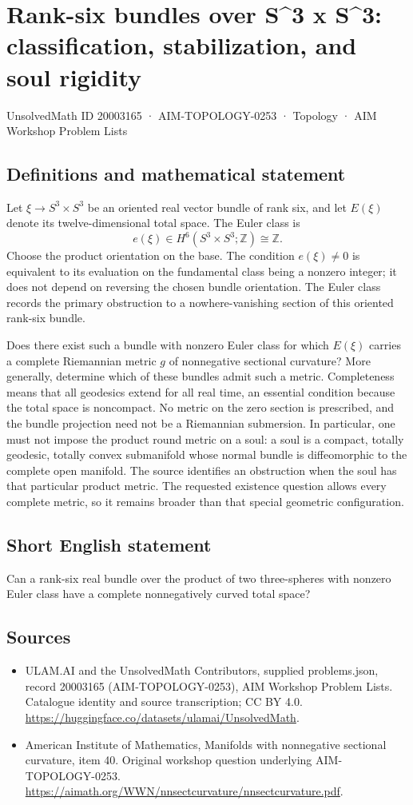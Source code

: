 \documentclass[11pt,a4paper]{article}
\begin{document}
\section*{Rank-six bundles over S\textasciicircum{}3 x S\textasciicircum{}3: classification, stabilization, and soul rigidity}\label{20003165}
{\small UnsolvedMath ID 20003165 · AIM-TOPOLOGY-0253 · Topology · AIM Workshop Problem Lists}
\subsection{Definitions and mathematical statement}
Let $\xi\to S^3\times S^3$ be an oriented real vector bundle of rank six, and let $E(\xi)$ denote its twelve-dimensional total space.
The Euler class is
\[
 e(\xi)\in H^6(S^3\times S^3;\mathbb Z)\cong\mathbb Z.
\]
Choose the product orientation on the base.
The condition $e(\xi)\ne0$ is equivalent to its evaluation on the fundamental class being a nonzero integer; it does not depend on reversing the chosen bundle orientation.
The Euler class records the primary obstruction to a nowhere-vanishing section of this oriented rank-six bundle.

Does there exist such a bundle with nonzero Euler class for which $E(\xi)$ carries a complete Riemannian metric $g$ of nonnegative sectional curvature?
More generally, determine which of these bundles admit such a metric.
Completeness means that all geodesics extend for all real time, an essential condition because the total space is noncompact.
No metric on the zero section is prescribed, and the bundle projection need not be a Riemannian submersion.
In particular, one must not impose the product round metric on a soul: a soul is a compact, totally geodesic, totally convex submanifold whose normal bundle is diffeomorphic to the complete open manifold.
The source identifies an obstruction when the soul has that particular product metric.
The requested existence question allows every complete metric, so it remains broader than that special geometric configuration.
\subsection{Short English statement}
Can a rank-six real bundle over the product of two three-spheres with nonzero Euler class have a complete nonnegatively curved total space?
\subsection{Sources}
\begin{itemize}
\item[S1] ULAM.AI and the UnsolvedMath Contributors, supplied problems.json, record 20003165 (AIM-TOPOLOGY-0253), AIM Workshop Problem Lists. Catalogue identity and source transcription; CC BY 4.0.
\url{https://huggingface.co/datasets/ulamai/UnsolvedMath}.
\item[S2] American Institute of Mathematics, Manifolds with nonnegative sectional curvature, item 40. Original workshop question underlying AIM-TOPOLOGY-0253.
\url{https://aimath.org/WWN/nnsectcurvature/nnsectcurvature.pdf}.
\end{itemize}
\end{document}
